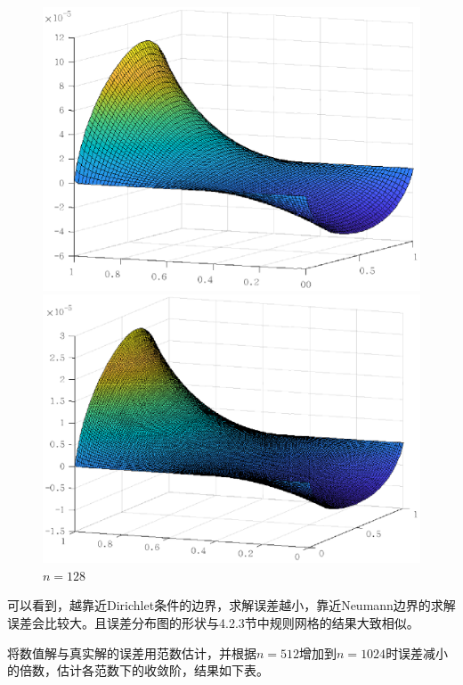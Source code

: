 \documentclass[lang=cn,10pt]{elegantbook}
\begin{document}
\begin{figure}[H]
\begin{minipage}[t]{0.24\linewidth}
    \includegraphics[width=0.95\linewidth]{figure/3-3-3.eps}
    \caption*{$n=64$}
  \end{minipage}
  \begin{minipage}[t]{0.24\linewidth}
    \centering
    \includegraphics[width=0.95\linewidth]{figure/3-3-4.eps}
    \caption*{$n=128$}
  \end{minipage}
\end{figure}

可以看到，越靠近Dirichlet条件的边界，求解误差越小，靠近Neumann边界的求解误差会比较大。且误差分布图的形状与4.2.3节中规则网格的结果大致相似。

将数值解与真实解的误差用范数估计，并根据$n=512$增加到$n=1024$时误差减小的倍数，估计各范数下的收敛阶，结果如下表。
\end{document}
